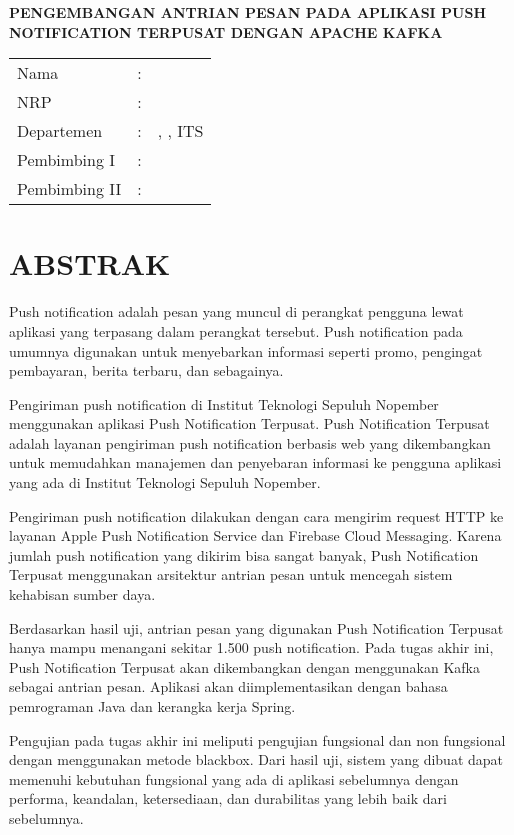 \begin{center}
	\centering\noindent\textbf{\MakeUppercase{Pengembangan Antrian Pesan pada Aplikasi Push Notification Terpusat dengan Apache Kafka}}
\end{center}
\vspace*{1em}

\noindent\begin{tabularx}{\linewidth}{l l X}
	Nama & : & \penulis \\
	NRP & :	& \nrp \\
	Departemen & : & \jurusan, \newline \fakultas, ITS \\
	Pembimbing I & : & \pembimbingsatu \\
	Pembimbing II & : & \pembimbingdua
\end {tabularx}

{\let\clearpage\relax\titlespacing{\chapter}{0em}{0em}{1em} \chapter{ABSTRAK}}
\itshape
\par Push notification adalah pesan yang muncul di perangkat pengguna lewat aplikasi yang terpasang dalam perangkat tersebut. Push notification pada umumnya digunakan untuk menyebarkan informasi seperti promo, pengingat pembayaran, berita terbaru, dan sebagainya.
\par Pengiriman push notification di Institut Teknologi Sepuluh Nopember menggunakan aplikasi Push Notification Terpusat. Push Notification Terpusat adalah layanan pengiriman push notification berbasis web yang dikembangkan untuk memudahkan manajemen dan penyebaran informasi ke pengguna aplikasi yang ada di Institut Teknologi Sepuluh Nopember.
\par Pengiriman push notification dilakukan dengan cara mengirim request HTTP ke layanan Apple Push Notification Service dan Firebase Cloud Messaging. Karena jumlah push notification yang dikirim bisa sangat banyak, Push Notification Terpusat menggunakan arsitektur antrian pesan untuk mencegah sistem kehabisan sumber daya.
\par Berdasarkan hasil uji, antrian pesan yang digunakan Push Notification Terpusat hanya mampu menangani sekitar 1.500 push notification. Pada tugas akhir ini, Push Notification Terpusat akan dikembangkan dengan menggunakan Kafka sebagai antrian pesan. Aplikasi akan diimplementasikan dengan bahasa pemrograman Java dan kerangka kerja Spring.
\par Pengujian pada tugas akhir ini meliputi pengujian fungsional dan non fungsional dengan menggunakan metode blackbox. Dari hasil uji, sistem yang dibuat dapat memenuhi kebutuhan fungsional yang ada di aplikasi sebelumnya dengan performa, keandalan, ketersediaan, dan durabilitas yang lebih baik dari sebelumnya.

